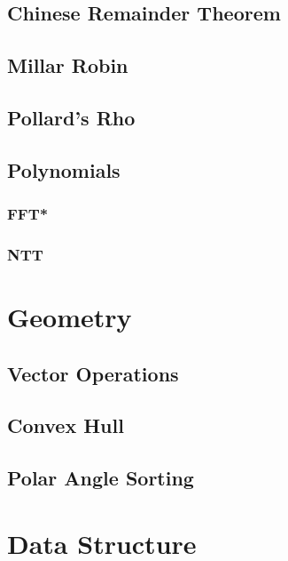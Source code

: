 \subsection{Chinese Remainder Theorem}

\subsection{Millar Robin}

\subsection{Pollard's Rho}

\subsection{Polynomials}
\subsubsection{FFT*}

\subsubsection{NTT}


\section{Geometry}
\subsection{Vector Operations}

\subsection{Convex Hull}

\subsection{Polar Angle Sorting}


\section{Data Structure}
